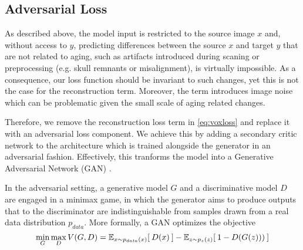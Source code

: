 \subsection{Adversarial Loss}

As described above, the model input is restricted to the source image $x$ and, without access to $y$, predicting differences between the source $x$ and target $y$ that are not related to aging, such as artifacts introduced during scaning or preprocessing (e.g. skull remnants or misalignment), is virtually impossible. As a consequence, our loss function should be invariant to such changes, yet this is not the case for the reconstruction term. Moreover, the term introduces image noise which can be problematic given the small scale of aging related changes.


Therefore, we remove the reconstruction loss term in \autoref{eq:voxloss} and replace it with an adversarial loss component. We achieve this by adding a secondary critic network to the architecture which is trained alongside the generator in an adversarial fashion. Effectively, this tranforms the model into a Generative Adversarial Network (GAN) \cite{GAN}.

In the adversarial setting, a generative model $G$ and a discriminative model $D$ are engaged in a minimax game, in which the generator aims to produce outputs that to the discriminator are indistinguishable from samples drawn from a real data distribution $p_{data}$. More formally, a GAN optimizes the objective
\begin{equation}
	\min_G \max_D V(G, D) = \mathbb{E}_{ x \sim p_{data}(x) } [ \: D (x) \: ] 
	 - \mathbb{E}_{ z \sim p_z(z) } [ \: 1 - D (G(z))) \: ]
\end{equation}


